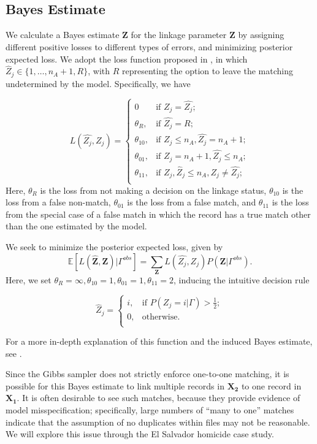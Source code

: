 \documentclass[ba]{imsart}
\begin{document}
\hypertarget{bayes-estimate}{%
	\subsection{Bayes Estimate}
	\label{bayes-estimate}}

We calculate a Bayes estimate \(\hat{\bm{Z}}\) for the linkage
parameter \(\bm{Z}\) by assigning different positive losses to
different types of errors, and minimizing posterior expected loss. We
adopt the loss function proposed in \cite{sadinle_bayesian_2017}, in which
\(\hat{Z}_j \in \{1, \ldots, n_A + 1, R\}\), with \(R\) representing the
option to leave the matching undetermined by the model. Specifically, we have

\[L(\hat{Z_j}, Z_j)=\begin{cases} 
	0  & \text{if } Z_j = \hat{Z_j}; \\
	\theta_R,  & \text{if } \hat{Z_j} = R; \\
	\theta_{10},  & \text{if } Z_j \leq n_A,\hat{Z_j} = n_A + 1 ; \\
	\theta_{01},  & \text{if } Z_j = n_A + 1,\hat{Z_j} \leq n_A ; \\
	\theta_{11},  & \text{if } Z_j, \hat{Z}_j \leq n_A, Z_j \neq \hat{Z_j} ; \\
\end{cases}\] Here, \(\theta_R\) is the loss from not making a decision
on the linkage status, \(\theta_{10}\) is the loss from a false
non-match, \(\theta_{01}\) is the loss from a false match, and
\(\theta_{11}\) is the loss from the special case of a false match in
which the record has a true match other than the one estimated by the
model. 

We seek to minimize the posterior expected loss, given by 
$$\mathbb{E}[L(\hat{\bm{Z}}, \bm{Z})|\Gamma^{obs}] = \sum_{\bm{Z}} L(\hat{Z_j}, Z_j)P(\bm{Z}|\Gamma^{obs}).$$
Here, we set $\theta_R = \infty, \theta_{10} = 1, \theta_{01} = 1, \theta_{11} = 2$, inducing the intuitive decision rule

\[\hat{Z}_j =\begin{cases} 
	i,  & \text{if } P(Z_j = i |\Gamma) > \frac{1}{2}; \\
	0,  & \text{otherwise}. \\
\end{cases}\]

For a more in-depth explanation of this function and the induced Bayes
estimate, see \cite{sadinle_bayesian_2017}.

Since the Gibbs sampler does not strictly enforce one-to-one matching, it is possible for this Bayes estimate to link multiple records in $\bm{X_2}$ to one record in $\bm{X_1}$. It is often desirable to see such matches, because they provide evidence of model misspecification; specifically, large numbers of ``many to one'' matches indicate that the assumption of no duplicates within files may not be reasonable. We will explore this issue through the El Salvador homicide case study. 
\end{document}
